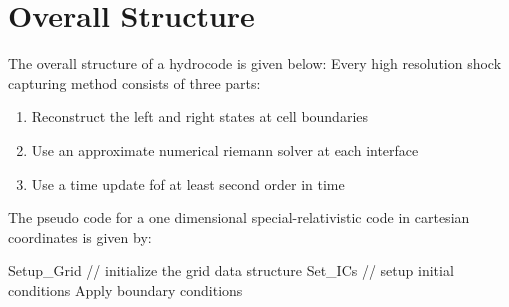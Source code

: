 \section{Overall Structure}
The overall structure of a hydrocode is given below:
Every high resolution shock capturing method consists of three parts:
\begin{enumerate}
        \item Reconstruct the left and right states at cell boundaries
        \item Use an approximate numerical riemann solver at each interface 
        \item Use a time update fof at least second order in time 
\end{enumerate}

The pseudo code for a one dimensional special-relativistic code in cartesian coordinates is given by:

\begin{algorithm}
        Setup_Grid // initialize the grid data structure\;
        Set_ICs // setup initial conditions\;
        Apply boundary conditions
\end{algorithm}
